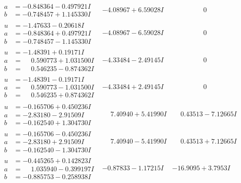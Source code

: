 \documentclass[1p]{elsarticle_modified}
\theoremstyle{definition}
\begin{document}
$$\begin{array}{c|c|c}
\begin{aligned}
a &= -0.848364 - 0.497921 I \\
b &= -0.748457 + 1.145330 I\end{aligned}
 & -4.08967 + 6.59028 I & \phantom{-0.000000 } 0 \\ \hline\begin{aligned}
u &= -1.47633 - 0.20618 I \\
a &= -0.848364 + 0.497921 I \\
b &= -0.748457 - 1.145330 I\end{aligned}
 & -4.08967 - 6.59028 I & \phantom{-0.000000 } 0 \\ \hline\begin{aligned}
u &= -1.48391 + 0.19171 I \\
a &= \phantom{-}0.590773 + 1.031500 I \\
b &= \phantom{-}0.546235 - 0.874362 I\end{aligned}
 & -4.33484 - 2.49145 I & \phantom{-0.000000 } 0 \\ \hline\begin{aligned}
u &= -1.48391 - 0.19171 I \\
a &= \phantom{-}0.590773 - 1.031500 I \\
b &= \phantom{-}0.546235 + 0.874362 I\end{aligned}
 & -4.33484 + 2.49145 I & \phantom{-0.000000 } 0 \\ \hline\begin{aligned}
u &= -0.165706 + 0.450236 I \\
a &= -2.83180 - 2.91509 I \\
b &= -0.162540 + 1.304730 I\end{aligned}
 & \phantom{-}7.40940 + 5.41990 I & \phantom{-}0.43513 - 7.12665 I \\ \hline\begin{aligned}
u &= -0.165706 - 0.450236 I \\
a &= -2.83180 + 2.91509 I \\
b &= -0.162540 - 1.304730 I\end{aligned}
 & \phantom{-}7.40940 - 5.41990 I & \phantom{-}0.43513 + 7.12665 I \\ \hline\begin{aligned}
u &= -0.445265 + 0.142823 I \\
a &= \phantom{-}1.035940 - 0.399197 I \\
b &= -0.885753 - 0.258938 I\end{aligned}
 & -0.87833 - 1.17215 I & -16.9095 + 3.7953 I \\ \hline\begin{aligned}

\end{aligned}
\end{array}$$
\end{document}
